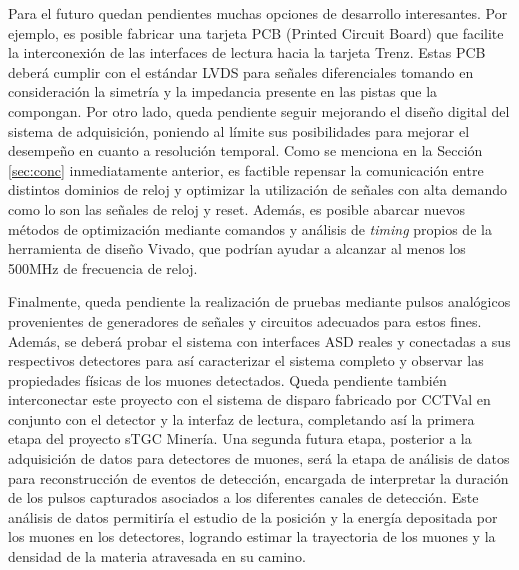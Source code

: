 Para el futuro quedan pendientes muchas opciones de desarrollo interesantes. Por ejemplo, es posible fabricar una tarjeta PCB (Printed Circuit Board) que facilite la interconexión de las interfaces de lectura hacia la tarjeta Trenz. Estas PCB deberá cumplir con el estándar LVDS para señales diferenciales tomando en consideración la simetría y la impedancia presente en las pistas que la compongan. Por otro lado, queda pendiente seguir mejorando el diseño digital del sistema de adquisición, poniendo al límite sus posibilidades para mejorar el desempeño en cuanto a resolución temporal. Como se menciona en la Sección \ref{sec:conc} inmediatamente anterior, es factible repensar la comunicación entre distintos dominios de reloj y optimizar la utilización de señales con alta demando como lo son las señales de reloj y reset. Además, es posible abarcar nuevos métodos de optimización mediante comandos y análisis de \textit{timing} propios de la herramienta de diseño Vivado, que podrían ayudar a alcanzar al menos los 500MHz de frecuencia de reloj.

Finalmente, queda pendiente la realización de pruebas mediante pulsos analógicos provenientes de generadores de señales y circuitos adecuados para estos fines. Además, se deberá probar el sistema con interfaces ASD reales y conectadas a sus respectivos detectores para así caracterizar el sistema completo y observar las propiedades físicas de los muones detectados. Queda pendiente también interconectar este proyecto con el sistema de disparo\cite{Oyanadel2020SistemaSTGC} fabricado por CCTVal en conjunto con el detector y la interfaz de lectura, completando así la primera etapa del proyecto sTGC Minería. Una segunda futura etapa, posterior a la adquisición de datos para detectores de muones, será la etapa de análisis de datos para reconstrucción de eventos de detección, encargada de interpretar la duración de los pulsos capturados asociados a los diferentes canales de detección. Este análisis de datos permitiría el estudio de la posición y la energía depositada por los muones en los detectores, logrando estimar la trayectoria de los muones y la densidad de la materia atravesada en su camino.
